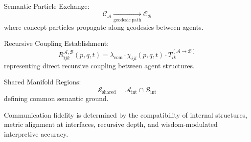 Semantic Particle Exchange:
\begin{equation}
\mathcal{C}_{\mathcal{A}} \xrightarrow[\mathrm{geodesic\ path}]{} \mathcal{C}_{\mathcal{B}}
\end{equation}
where concept particles propagate along geodesics between agents.

Recursive Coupling Establishment:
\begin{equation}
R_{ijk}^{\mathcal{A},\mathcal{B}}(p, q, t) = \lambda_{\mathrm{com}} \cdot \chi_{ijl}(p, q, t) \cdot T_{lk}^{(\mathcal{A} \to \mathcal{B})}
\end{equation}
representing direct recursive coupling between agent structures.

Shared Manifold Regions:
\begin{equation}
\mathcal{S}_{\mathrm{shared}} = \mathcal{A}_{\mathrm{int}} \cap \mathcal{B}_{\mathrm{int}}
\end{equation}
defining common semantic ground.

Communication fidelity is determined by the compatibility of internal structures, metric alignment at interfaces, recursive depth, and wisdom-modulated interpretive accuracy. 